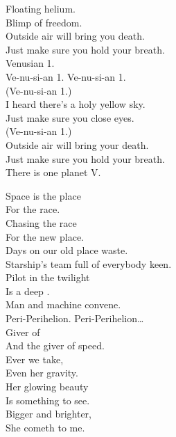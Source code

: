 Floating helium. \\
Blimp of freedom. \\
Outside air will bring you death. \\
Just make sure you hold your breath. \\
Venusian 1. \\

Ve-nu-si-an 1. Ve-nu-si-an 1. \\

(Ve-nu-si-an 1.) \\
I heard there's a holy yellow sky. \\
Just make sure you close eyes. \\

(Ve-nu-si-an 1.) \\
Outside air will bring your death. \\
Just make sure you hold your breath. \\

There is one planet V. \\





Space is the place \\
For the  race. \\
Chasing the race \\
For the new place. \\
Days on our old place waste. \\
Starship's team full of everybody keen. \\
Pilot in the twilight \\
Is a deep . \\
Man and machine convene. \\

Peri-Perihelion. Peri-Perihelion… \\

Giver of  \\
And the giver of speed. \\
Ever we take, \\
Even her gravity. \\
Her glowing beauty \\
Is something to see. \\
Bigger and brighter, \\
She cometh to me. \\

